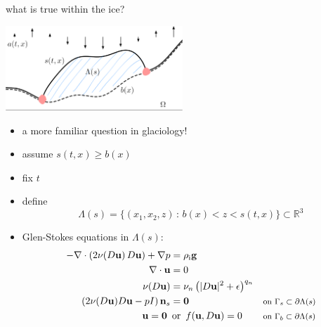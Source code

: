 \documentclass[10pt,dvipsnames]{beamer}
\newcommand{\bg}{\mathbf{g}}
\newcommand{\bn}{\mathbf{n}}
\newcommand{\bu}{\mathbf{u}}
\newcommand{\bzero}{\bm{0}}
\newcommand{\RR}{\mathbb{R}}
\newcommand{\eps}{\epsilon}
\newcommand{\rhoi}{\rho_{\text{i}}}
\newcommand{\where}[1]{\text{\footnotesize #1}}
\begin{document}
\begin{frame}{what is true within the ice?}

\hfill \includegraphics[width=0.5\textwidth]{stokesdomainpink}

\vspace{-25mm}

\begin{minipage}[t]{50mm}
\begin{itemize}
\item a more familiar question in glaciology!
\item assume $s(t,x) \ge b(x)$
\item fix $t$
\end{itemize}
\end{minipage}

\begin{itemize}
\item define
    $$\Lambda(s) = \{(x_1,x_2,z)\,:\,b(x)<z<s(t,x)\} \subset \RR^3$$
\item Glen-Stokes equations in $\Lambda(s)$:
\begin{align*}
- \nabla \cdot \left(2 \nu(D\bu)\, D\bu\right) + \nabla p &= \rhoi \bg &&  \\
\nabla \cdot \bu &= 0 &&  \\
\nu(D\bu) &= \nu_n \left(|D\bu|^2 + \eps\right)^{q_n} &&  \\
\left(2 \nu(D\bu) D\bu - pI\right) \bn_s &= \bzero && \where{on $\Gamma_s \subset \partial\Lambda(s)$} \\
\bu  = \bzero \text{ } &\,\text{or } \,f(\bu,D\bu)=0 && \where{on $\Gamma_b \subset \partial\Lambda(s)$}
\end{align*}
\end{itemize}
\end{frame}
\end{document}
